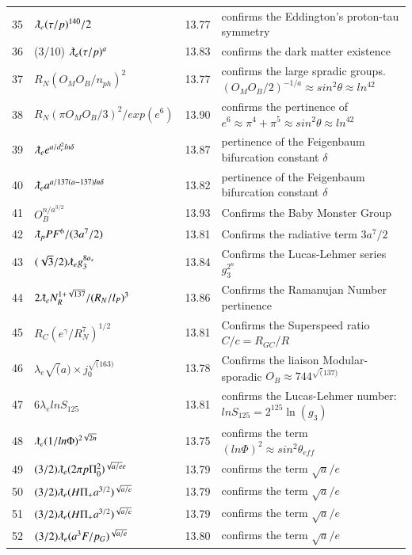 \documentclass[a4paper,9pt]{article}
\begin{document}
\begin{appendix}
\begin{table}
\begin{tabular}{llll}
    35& $\lambdabar_{e} (\tau /p)^{140}/2$ & 13.77 & confirms the Eddington's proton-tau symmetry \\
    36& (3/10) $\lambdabar_{e} (\tau /p)^a$ & 13.83 & confirms the dark matter existence \\
    37& $R_N (O_M O_B/n_{ph})^2$ & 13.77 & confirms the large spradic groups. $(O_M O_B/2)^{-1/a} \approx sin^2\theta \approx ln^42$ \\
    38 & $R_N (\pi O_M O_B/3)^2 / exp(e^6)$ & 13.90 & confirms the pertinence of $e^6 \approx \pi^4 + \pi^5  \approx sin^2\theta \approx ln^42$ \\
    
    39 & $\lambdabar_{e} e^{a/d_e^2 ln\delta} $ & 13.87 & pertinence of the Feigenbaum bifurcation constant $\delta$ \\   
    40 & $\lambdabar_{e} a^{a/137(a-137) ln\delta} $ & 13.82 & pertinence of the Feigenbaum bifurcation constant $\delta$ \\
    41 & $O_B^{n/ a^{3/2}}$ & 13.93 & Confirms the Baby Monster Group \\
    42 & $ \lambdabar_{p} PF^6/(3a^7/2)$ & 13.81 & Confirms the radiative term $3a^7/2$ \\
    43 & $(\sqrt{3}/2)\lambdabar_{e}g_3^{8a_s}$ & 13.84 & Confirms the Lucas-Lehmer series $g_ 3^{2^n}$ \\
    44 & $2\lambdabar_{e} N_R^{1+\sqrt{137}}/(R_N/l_P)^3$ & 13.86 & Confirms the Ramanujan Number pertinence \\
    45 & $R_{C} (e^\gamma/R_N^7)^{1/2}$ & 13.81 & Confirms the Superspeed ratio $C/c = R_{GC}/R$\\
    46 & $\lambda_{e} \sqrt(a) \times j_0 ^{\sqrt(163)}$   & 13.78 & Confirms the  liaison Modular-sporadic $O_B \approx 744^{ \sqrt(137)}$ \\ 
    47 & $ 6\lambda_{e} lnS_{125} $   & 13.81 & confirms the Lucas-Lehmer number: $lnS_{125}  = 2^{125} \ln(g_3) $ \\    
    48 & $ \lambdabar_e (1/ln\Phi)^{2\sqrt{2n}}  $   & 13.75 & confirms the term $(ln\Phi)^2 \approx sin^2\theta_{eff}$  \\     
    49 & $ (3/2) \lambdabar_e (2\pi p \Pi_0^2)^{\sqrt{a/e}e}  $   & 13.79 & confirms the term $\sqrt a /e$  \\     
    50 & $ (3/2) \lambdabar_e (H \Pi_+ a^{3/2})^{\sqrt{a/e}}  $   & 13.79 & confirms the term $\sqrt a /e$  \\    
    51 & $ (3/2) \lambdabar_e (H \Pi_+ a^{3/2})^{\sqrt{a/e}}  $   & 13.79 & confirms the term $\sqrt a /e$  \\     
    52 & $ (3/2) \lambdabar_e (a^3 F/p_G)^{\sqrt{a/e}}  $   & 13.80 & confirms the term $\sqrt a /e$  \\   
    

\end{tabular}
\end{table}
\end{appendix}
\end{document}
